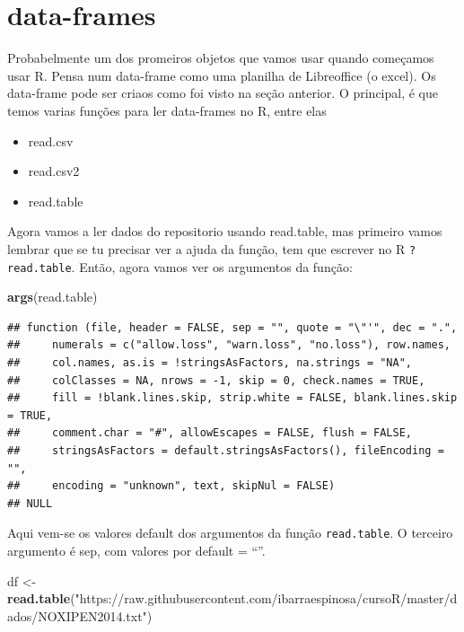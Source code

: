 \documentclass[]{book}
\newenvironment{Shaded}{\begin{snugshade}}{\end{snugshade}}
\newcommand{\KeywordTok}[1]{\textcolor[rgb]{0.13,0.29,0.53}{\textbf{#1}}}
\newcommand{\StringTok}[1]{\textcolor[rgb]{0.31,0.60,0.02}{#1}}
\newcommand{\NormalTok}[1]{#1}
\providecommand{\tightlist}{%
  \setlength{\itemsep}{0pt}\setlength{\parskip}{0pt}}
\theoremstyle{definition}
\theoremstyle{definition}
\theoremstyle{definition}
\theoremstyle{remark}
\begin{document}
\section{data-frames}\label{data-frames}

Probabelmente um dos promeiros objetos que vamos usar quando começamos
usar R. Pensa num data-frame como uma planilha de Libreoffice (o excel).
Os data-frame pode ser criaos como foi visto na seção anterior. O
principal, é que temos varias funções para ler data-frames no R, entre
elas

\begin{itemize}
\tightlist
\item
  read.csv
\item
  read.csv2
\item
  read.table
\end{itemize}

Agora vamos a ler dados do repositorio usando read.table, mas primeiro
vamos lembrar que se tu precisar ver a ajuda da função, tem que escrever
no R \texttt{?read.table}. Então, agora vamos ver os argumentos da
função:

\begin{Shaded}
\begin{Highlighting}[]
\KeywordTok{args}\NormalTok{(read.table)}
\end{Highlighting}
\end{Shaded}

\begin{verbatim}
## function (file, header = FALSE, sep = "", quote = "\"'", dec = ".", 
##     numerals = c("allow.loss", "warn.loss", "no.loss"), row.names, 
##     col.names, as.is = !stringsAsFactors, na.strings = "NA", 
##     colClasses = NA, nrows = -1, skip = 0, check.names = TRUE, 
##     fill = !blank.lines.skip, strip.white = FALSE, blank.lines.skip = TRUE, 
##     comment.char = "#", allowEscapes = FALSE, flush = FALSE, 
##     stringsAsFactors = default.stringsAsFactors(), fileEncoding = "", 
##     encoding = "unknown", text, skipNul = FALSE) 
## NULL
\end{verbatim}

Aqui vem-se os valores default dos argumentos da função
\texttt{read.table}. O terceiro argumento é sep, com valores por default
= ``''.

\begin{Shaded}
\begin{Highlighting}[]
\NormalTok{df <-}\StringTok{ }\KeywordTok{read.table}\NormalTok{(}\StringTok{"https://raw.githubusercontent.com/ibarraespinosa/cursoR/master/dados/NOXIPEN2014.txt"}\NormalTok{)}
\end{Highlighting}
\end{Shaded}
\end{document}
